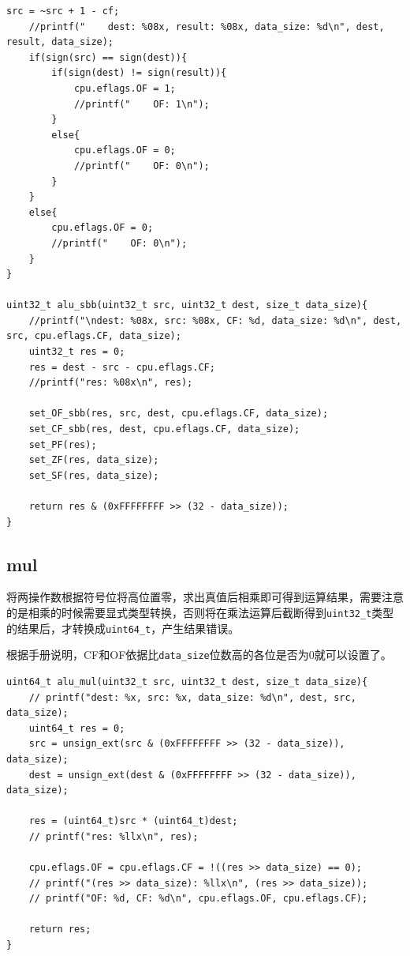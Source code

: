 \documentclass[UTF8]{ctexart}
\begin{document}
\begin{lstlisting}[style=CStyle]
    src = ~src + 1 - cf;
    //printf("    dest: %08x, result: %08x, data_size: %d\n", dest, result, data_size);
    if(sign(src) == sign(dest)){
        if(sign(dest) != sign(result)){
            cpu.eflags.OF = 1;
            //printf("    OF: 1\n");
        }
        else{
            cpu.eflags.OF = 0;
            //printf("    OF: 0\n");
        }
    }
    else{
        cpu.eflags.OF = 0;
        //printf("    OF: 0\n");
    }
}

uint32_t alu_sbb(uint32_t src, uint32_t dest, size_t data_size){
    //printf("\ndest: %08x, src: %08x, CF: %d, data_size: %d\n", dest, src, cpu.eflags.CF, data_size);
    uint32_t res = 0;
    res = dest - src - cpu.eflags.CF;
    //printf("res: %08x\n", res);
    
    set_OF_sbb(res, src, dest, cpu.eflags.CF, data_size);
    set_CF_sbb(res, dest, cpu.eflags.CF, data_size);
    set_PF(res);
    set_ZF(res, data_size);
    set_SF(res, data_size);
    
    return res & (0xFFFFFFFF >> (32 - data_size));
}
\end{lstlisting}

\subsection{mul}
将两操作数根据符号位将高位置零，求出真值后相乘即可得到运算结果，需要注意的是相乘的时候需要显式类型转换，否则将在乘法运算后截断得到\verb|uint32_t|类型的结果后，才转换成\verb|uint64_t|，产生结果错误。
\par 根据手册说明，CF和OF依据比\verb|data_size|位数高的各位是否为0就可以设置了。

\begin{lstlisting}[style=CStyle]
uint64_t alu_mul(uint32_t src, uint32_t dest, size_t data_size){
    // printf("dest: %x, src: %x, data_size: %d\n", dest, src, data_size);
    uint64_t res = 0;
    src = unsign_ext(src & (0xFFFFFFFF >> (32 - data_size)), data_size);
    dest = unsign_ext(dest & (0xFFFFFFFF >> (32 - data_size)), data_size);
    
    res = (uint64_t)src * (uint64_t)dest;
    // printf("res: %llx\n", res);
    
    cpu.eflags.OF = cpu.eflags.CF = !((res >> data_size) == 0);
    // printf("(res >> data_size): %llx\n", (res >> data_size));
    // printf("OF: %d, CF: %d\n", cpu.eflags.OF, cpu.eflags.CF);
    
    return res;
}
\end{lstlisting}
\end{document}
